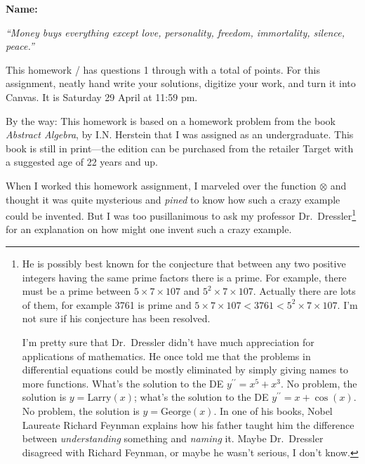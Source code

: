 \documentclass[12pt,fleqn,answers]{exam}
\newcommand\PM{{\sc pm}}
\newcommand{\term}{Spring}
\newcommand{\due}{Saturday 29 April at 11:59 \PM}
\begin{document}
\large
\vspace{0.1in}
\noindent{}
{\bf Name:}  \\
\noindent \makebox[3.0truein][l]{\bf Homework, \term \/ \the\year}
\vspace{0.1in}

\begin{flushleft}
  \emph{
    “Money buys everything except love, personality, freedom, immortality, silence, peace.”}
    \hfill {}
 \end{flushleft}


\noindent  This homework   /  has questions 1 through  \numquestions \/ with 
a total of  \numpoints\/  points. For this assignment, neatly hand write your solutions, digitize your work, and turn it into Canvas. It is \due.

By the way:  This homework is based on a homework problem from the book \emph{Abstract Algebra}, by I.N. Herstein that I was
assigned as an undergraduate.  This book is still in print---the  edition can be purchased from the retailer Target with a suggested age of  22 years and up.

 When I worked this homework assignment, I marveled over the  function $\otimes$ and thought it was quite mysterious and \emph{pined} to  know how such a crazy example  could be invented. But I was too pusillanimous to ask my professor Dr.\  Dressler\footnote{He  is possibly best known for 
 the conjecture that between any two positive integers having the same prime factors there is a prime.  For example, there must be 
 a prime between $5 \times 7 \times 107$ and $5^2\times 7 \times 107$.  Actually there are lots of them, for example 3761 is prime
 and $5 \times 7 \times 107 < 3761 < 5^2\times 7 \times 107$.  I'm not sure if his conjecture has been resolved.
 
 I'm pretty sure that Dr.\ Dressler didn't have
 much appreciation for applications of mathematics. He once told me that the problems in differential equations could be mostly eliminated
 by simply giving names to more functions.  What's the solution to the DE $y^{\prime\prime} = x^5 + x^3$.  No problem, the solution
 is $y= \mbox{Larry}(x)$; what's the solution to the DE $y^{\prime\prime} =  x + \cos(x)$.  No problem, the solution
 is $y= \mbox{George}(x)$.  In one of his books, Nobel Laureate Richard Feynman explains how his father taught him the 
  difference between \emph{understanding} something  and \emph{naming} it.  Maybe Dr.\  Dressler disagreed with Richard Feynman, or maybe he wasn't serious, I don't know. }
for an explanation on how might one invent such a crazy example.
\end{document}

